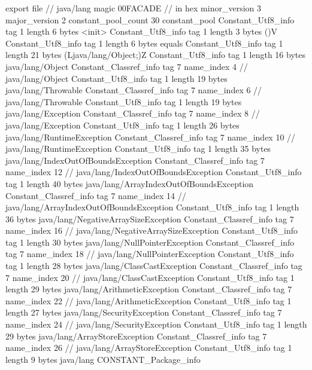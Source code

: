 export file {		// java/lang
	magic	00FACADE		 // in hex
	minor_version	3
	major_version	2
	constant_pool_count	30
	constant_pool {
		Constant_Utf8_info {
			tag	1
			length	6
			bytes	<init>
		}
		Constant_Utf8_info {
			tag	1
			length	3
			bytes	()V
		}
		Constant_Utf8_info {
			tag	1
			length	6
			bytes	equals
		}
		Constant_Utf8_info {
			tag	1
			length	21
			bytes	(Ljava/lang/Object;)Z
		}
		Constant_Utf8_info {
			tag	1
			length	16
			bytes	java/lang/Object
		}
		Constant_Classref_info {
			tag	7
			name_index	4		// java/lang/Object
		}
		Constant_Utf8_info {
			tag	1
			length	19
			bytes	java/lang/Throwable
		}
		Constant_Classref_info {
			tag	7
			name_index	6		// java/lang/Throwable
		}
		Constant_Utf8_info {
			tag	1
			length	19
			bytes	java/lang/Exception
		}
		Constant_Classref_info {
			tag	7
			name_index	8		// java/lang/Exception
		}
		Constant_Utf8_info {
			tag	1
			length	26
			bytes	java/lang/RuntimeException
		}
		Constant_Classref_info {
			tag	7
			name_index	10		// java/lang/RuntimeException
		}
		Constant_Utf8_info {
			tag	1
			length	35
			bytes	java/lang/IndexOutOfBoundsException
		}
		Constant_Classref_info {
			tag	7
			name_index	12		// java/lang/IndexOutOfBoundsException
		}
		Constant_Utf8_info {
			tag	1
			length	40
			bytes	java/lang/ArrayIndexOutOfBoundsException
		}
		Constant_Classref_info {
			tag	7
			name_index	14		// java/lang/ArrayIndexOutOfBoundsException
		}
		Constant_Utf8_info {
			tag	1
			length	36
			bytes	java/lang/NegativeArraySizeException
		}
		Constant_Classref_info {
			tag	7
			name_index	16		// java/lang/NegativeArraySizeException
		}
		Constant_Utf8_info {
			tag	1
			length	30
			bytes	java/lang/NullPointerException
		}
		Constant_Classref_info {
			tag	7
			name_index	18		// java/lang/NullPointerException
		}
		Constant_Utf8_info {
			tag	1
			length	28
			bytes	java/lang/ClassCastException
		}
		Constant_Classref_info {
			tag	7
			name_index	20		// java/lang/ClassCastException
		}
		Constant_Utf8_info {
			tag	1
			length	29
			bytes	java/lang/ArithmeticException
		}
		Constant_Classref_info {
			tag	7
			name_index	22		// java/lang/ArithmeticException
		}
		Constant_Utf8_info {
			tag	1
			length	27
			bytes	java/lang/SecurityException
		}
		Constant_Classref_info {
			tag	7
			name_index	24		// java/lang/SecurityException
		}
		Constant_Utf8_info {
			tag	1
			length	29
			bytes	java/lang/ArrayStoreException
		}
		Constant_Classref_info {
			tag	7
			name_index	26		// java/lang/ArrayStoreException
		}
		Constant_Utf8_info {
			tag	1
			length	9
			bytes	java/lang
		}
		CONSTANT_Package_info {
}}}
